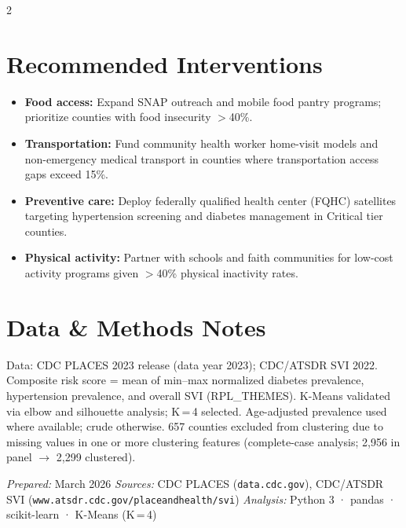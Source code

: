 \documentclass[10pt,letterpaper]{article}
\begin{document}
\begin{multicols}{2}
\section{Recommended Interventions}

\begin{itemize}\setlength\itemsep{1pt}
  \item \textbf{Food access:} Expand SNAP outreach and mobile food pantry
        programs; prioritize counties with food insecurity $>$40\%.
  \item \textbf{Transportation:} Fund community health worker home-visit models
        and non-emergency medical transport in counties where transportation
        access gaps exceed 15\%.
  \item \textbf{Preventive care:} Deploy federally qualified health center
        (FQHC) satellites targeting hypertension screening and diabetes
        management in Critical tier counties.
  \item \textbf{Physical activity:} Partner with schools and faith communities
        for low-cost activity programs given $>$40\% physical inactivity rates.
\end{itemize}

\section{Data \& Methods Notes}

{\small\color{muted}
Data: CDC PLACES 2023 release (data year 2023); CDC/ATSDR SVI 2022.
Composite risk score = mean of min--max normalized diabetes prevalence,
hypertension prevalence, and overall SVI (RPL\_THEMES).
K-Means validated via elbow and silhouette analysis; K\,=\,4 selected.
Age-adjusted prevalence used where available; crude otherwise.
657 counties excluded from clustering due to missing values in one or more
clustering features (complete-case analysis; 2{,}956 in panel $\to$ 2{,}299 clustered).
}

\end{multicols}

\vspace{1pt}
{\footnotesize\color{muted}
\textit{Prepared:} March 2026 \quad
\textit{Sources:} CDC PLACES (\texttt{data.cdc.gov}), CDC/ATSDR SVI (\texttt{www.atsdr.cdc.gov/placeandhealth/svi}) \quad
\textit{Analysis:} Python 3 · pandas · scikit-learn · K-Means (K\,=\,4)
}
\end{document}
